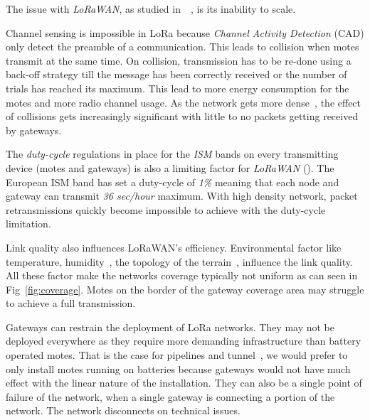 

The issue with \emph{LoRaWAN}, as studied 
in~\cite{8030482}~\cite{10.1145/2988287.2989163}, is its inability to scale. 

Channel sensing is impossible in LoRa because \emph{Channel Activity Detection}
(CAD) only detect the preamble of a communication. %
This leads to collision when motes transmit at the same time.
On collision, transmission has to be re-done using a back-off strategy till the
message has been correctly received or the number of trials has reached its
maximum.
This lead to more energy consumption for the motes and more radio 
channel usage.
As the network gets more dense~\cite{8030482}, the effect of collisions gets
increasingly significant with little to no packets getting received by gateways.


The \emph{duty-cycle} regulations in place for the \emph{ISM} bands on every
transmitting device (motes and gateways) is also a limiting factor 
for \emph{LoRaWAN} (\cite{8030482}).
The European ISM band has set a duty-cycle of \emph{1\%} meaning that each node 
and gateway can transmit \emph{36 sec/hour} maximum. 
With high density network, packet retransmissions quickly become impossible to
achieve with the duty-cycle limitation.


Link quality also influences LoRaWAN's efficiency. 
Environmental factor like temperature,
humidity~\cite{evaluation_of_the_reliability_of_lora}, the topology of the
terrain~\cite{lorajambalaya}, influence the link quality.
All these factor make the networks coverage typically not uniform 
as can seen in Fig~\ref{fig:coverage}.
Motes on the border of the gateway coverage area may struggle to
achieve a full transmission. 

Gateways can restrain the deployment of LoRa networks.
They may not be deployed everywhere as they require more demanding infrastructure 
than battery operated motes.
That is the case for pipelines and tunnel~\cite{Abrardo_2019},
we would prefer to only install motes running on batteries because
gateways would not have much effect with the linear nature of the installation.
They can also be a single point of failure of the network, when a single
gateway is connecting a portion of the network. 
The network disconnects on technical issues.


